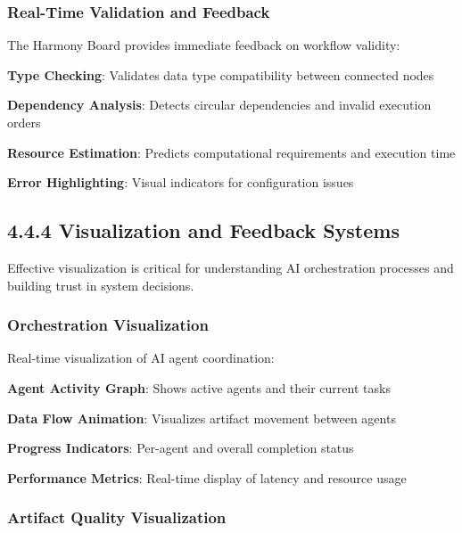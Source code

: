 \subsubsection*{Real-Time Validation and Feedback}

The Harmony Board provides immediate feedback on workflow validity:

\begin{compactlist}
    \item \textbf{Type Checking}: Validates data type compatibility between connected nodes
    \item \textbf{Dependency Analysis}: Detects circular dependencies and invalid execution orders
    \item \textbf{Resource Estimation}: Predicts computational requirements and execution time
    \item \textbf{Error Highlighting}: Visual indicators for configuration issues
\end{compactlist}

\subsection*{4.4.4 Visualization and Feedback Systems}
\label{subsec:visualization-feedback}

Effective visualization is critical for understanding AI orchestration processes and building trust in system decisions.

\subsubsection*{Orchestration Visualization}

Real-time visualization of AI agent coordination:

\begin{expandedlist}
    \item \textbf{Agent Activity Graph}: Shows active agents and their current tasks
    \item \textbf{Data Flow Animation}: Visualizes artifact movement between agents
    \item \textbf{Progress Indicators}: Per-agent and overall completion status
    \item \textbf{Performance Metrics}: Real-time display of latency and resource usage
\end{expandedlist}

\subsubsection*{Artifact Quality Visualization}

